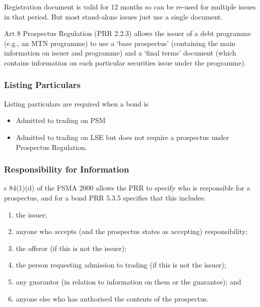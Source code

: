 \documentclass[
]{article}
\providecommand{\tightlist}{%
  \setlength{\itemsep}{0pt}\setlength{\parskip}{0pt}}
\begin{document}
Registration document is valid for 12 months so can be re-used for
multiple issues in that period. But most stand-alone issues just use a
single document.

Art 8 Prospectus Regulation (PRR 2.2.3) allows the issuer of a debt
programme (e.g., an MTN programme) to use a `base prospectus'
(containing the main information on issuer and programme) and a `final
terms' document (which contains information on each particular
securities issue under the programme).

\hypertarget{listing-particulars}{%
\subsubsection{Listing Particulars}\label{listing-particulars}}

Listing particulars are required when a bond is

\begin{itemize}
\tightlist
\item
  Admitted to trading on PSM
\item
  Admitted to trading on LSE but does not require a prospectus under
  Prospectus Regulation.
\end{itemize}

\hypertarget{responsibility-for-information}{%
\subsubsection{Responsibility for
Information}\label{responsibility-for-information}}

s 84(1)(d) of the FSMA 2000 allows the PRR to specify who is responsible
for a prospectus, and for a bond PRR 5.3.5 specifies that this includes:

\begin{enumerate}
\def\labelenumi{\arabic{enumi}.}
\tightlist
\item
  the issuer;
\item
  anyone who accepts (and the prospectus states as accepting)
  responsibility;
\item
  the offeror (if this is not the issuer);
\item
  the person requesting admission to trading (if this is not the
  issuer);
\item
  any guarantor (in relation to information on them or the guarantee);
  and
\item
  anyone else who has authorised the contents of the prospectus.
\end{enumerate}
\end{document}
